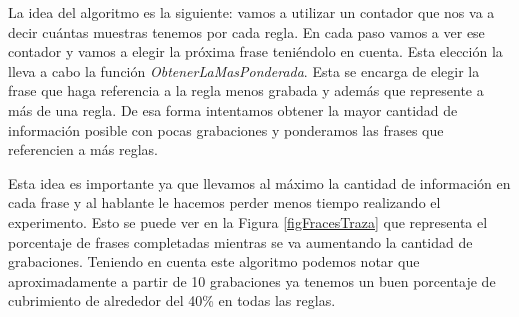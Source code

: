 La idea del algoritmo es la siguiente: vamos a utilizar un contador que nos va a decir cuántas muestras tenemos por cada regla. En cada paso vamos a ver ese contador y vamos a elegir la próxima frase teniéndolo en cuenta. Esta elección la lleva a cabo la función \textit{ObtenerLaMasPonderada}. Esta se encarga de elegir la frase que haga referencia a la regla menos grabada y además que represente a más de una regla. De esa forma intentamos obtener la mayor cantidad de información posible con pocas grabaciones y ponderamos las frases que referencien a más reglas. 

Esta idea es importante ya que llevamos al máximo la cantidad de información en cada frase y al hablante le hacemos perder menos tiempo realizando el experimento. Esto se puede ver en la Figura \ref{figFracesTraza} que representa el porcentaje de frases completadas mientras se va aumentando la cantidad de grabaciones. Teniendo en cuenta este algoritmo podemos notar que aproximadamente a partir de 10 grabaciones ya tenemos un buen porcentaje de cubrimiento de alrededor del 40\% en todas las reglas.


